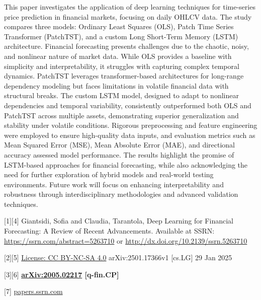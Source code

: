 \documentclass[conference]{IEEEtran}
\begin{document}
This paper investigates the application of deep learning techniques for time-series price prediction in financial markets, focusing on daily OHLCV data. The study compares three models: Ordinary Least Squares (OLS), Patch Time Series Transformer (PatchTST), and a custom Long Short-Term Memory (LSTM) architecture. Financial forecasting presents challenges due to the chaotic, noisy, and nonlinear nature of market data. While OLS provides a baseline with simplicity and interpretability, it struggles with capturing complex temporal dynamics. PatchTST leverages transformer-based architectures for long-range dependency modeling but faces limitations in volatile financial data with structural breaks. The custom LSTM model, designed to adapt to nonlinear dependencies and temporal variability, consistently outperformed both OLS and PatchTST across multiple assets, demonstrating superior generalization and stability under volatile conditions. Rigorous preprocessing and feature engineering were employed to ensure high-quality data inputs, and evaluation metrics such as Mean Squared Error (MSE), Mean Absolute Error (MAE), and directional accuracy assessed model performance. The results highlight the promise of LSTM-based approaches for financial forecasting, while also acknowledging the need for further exploration of hybrid models and real-world testing environments. Future work will focus on enhancing interpretability and robustness through interdisciplinary methodologies and advanced validation techniques.




[1][4] Giantsidi, Sofia and Claudia, Tarantola, Deep Learning for Financial Forecasting: A Review of Recent Advancements. Available at SSRN: \href{https://ssrn.com/abstract=5263710}{https://ssrn.com/abstract=5263710} or \href{https://dx.doi.org/10.2139/ssrn.5263710}{http://dx.doi.org/10.2139/ssrn.5263710}

[2][5] \href{https://arxiv.org/html/2501.17366v1\#:~:text=technical\%20indicators\%2C\%20we\%20evaluated\%20these,which\%20showcased\%20its\%20ability}{License: CC BY-NC-SA 4.0} arXiv:2501.17366v1 [cs.LG] 29 Jan 2025

[3][6] \textbf{\href{https://arxiv.org/abs/2005.02217}{arXiv:2005.02217} [q-fin.CP]}

[7] \href{https://papers.ssrn.com/sol3/papers.cfm?abstract_id=5263710\#:~:text=snapshot\%20of\%20the\%20current\%20state\%2C,analysis\%20play\%20a\%20crucial\%20role}{papers.ssrn.com}
\end{document}

